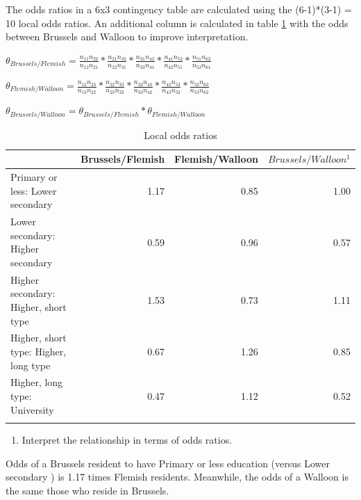 \documentclass[
  12pt,
]{article}
\providecommand{\tightlist}{%
  \setlength{\itemsep}{0pt}\setlength{\parskip}{0pt}}
\begin{document}
The odds ratios in a 6x3 contingency table are calculated using the (6-1)*(3-1) = 10 local odds ratios. An additional column is calculated in table \ref{tab:odds} with the odds between Brussels and Walloon to improve interpretation.

\(\theta_{Brussels/Flemish}=\frac{n_{11}n_{22}}{n_{12}n_{21}}*\frac{n_{21}n_{32}}{n_{22}n_{31}}*\frac{n_{31}n_{42}}{n_{32}n_{41}}*\frac{n_{41}n_{52}}{n_{42}n_{51}}*\frac{n_{51}n_{62}}{n_{52}n_{61}}\)

\(\theta_{Flemish/Walloon}=\frac{n_{12}n_{23}}{n_{13}n_{22}}*\frac{n_{22}n_{33}}{n_{23}n_{32}}*\frac{n_{32}n_{43}}{n_{33}n_{42}}*\frac{n_{42}n_{53}}{n_{43}n_{52}}*\frac{n_{52}n_{63}}{n_{53}n_{62}}\)

\(\theta_{Brussels/Walloon}=\theta_{Brussels/Flemish}*\theta_{Flemish/Walloon}\)

\begin{table}[H]

\caption{\label{tab:odds}Local odds ratios}
\centering
\begin{tabular}[t]{>{\raggedright\arraybackslash}p{3.5cm}|r|r|r}
\hline
  & Brussels/Flemish & Flemish/Walloon & $Brussels/Walloon^1$\\
\hline
Primary or less: Lower secondary & 1.17 & 0.85 & 1.00\\
\hline
Lower secondary: Higher secondary & 0.59 & 0.96 & 0.57\\
\hline
Higher secondary: Higher, short type & 1.53 & 0.73 & 1.11\\
\hline
Higher, short type: Higher, long type & 0.67 & 1.26 & 0.85\\
\hline
Higher, long type: University & 0.47 & 1.12 & 0.52\\
\hline
\multicolumn{4}{l}{\rule{0pt}{1em}\textsuperscript{1} Extra column to interpret relation between Brussels and Walloon}\\
\end{tabular}
\end{table}

\begin{enumerate}
\def\labelenumi{\alph{enumi}.}
\setcounter{enumi}{1}
\tightlist
\item
  Interpret the relationship in terms of odds ratios.
\end{enumerate}

Odds of a Brussels resident to have Primary or less education (versus Lower secondary ) is 1.17 times Flemish residents. Meanwhile, the odds of a Walloon is the same those who reside in Brussels.
\end{document}
